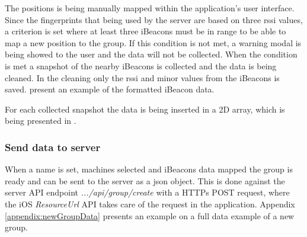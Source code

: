\bigskip

The positions is being manually mapped within the application's user interface.
Since the fingerprints that being used by the server are based on three \acrshort{rssi} values, a criterion is set where at least three iBeacons must be in range to be able to map a new position to the group.
If this condition is not met, a warning modal is being showed to the user and the data will not be collected.
When the condition is met a snapshot of the nearby iBeacons is collected and the data is being cleaned.
In the cleaning only the \acrshort{rssi} and minor values from the iBeacons is saved.
 present an example of the formatted iBeacon data.


For each collected snapshot the data is being inserted in a 2D array, which is being presented in .



\subsubsection{Send data to server}\label{sec:implAppnewGroupSend}
When a name is set, machines selected and iBeacons data mapped the group is ready and can be sent to the server as a \acrfull{json} object.
This is done against the server API endpoint \textit{.../api/group/create} with a HTTPs POST request, where the iOS \textit{ResourceUrl} API takes care of the request in the application.
Appendix \ref{appendix:newGroupData} presents an example on a full data example of a new group.
